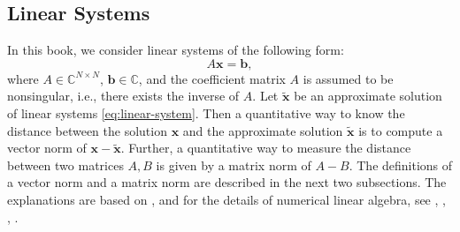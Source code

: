 \subsection{{Linear Systems}}\label{sec:linear-systems}
{In this book, we consider linear systems of the following form:}
\begin{equation}\label{eq:linear-system}
A\bm x=\bm b,
\end{equation}
{where $A\in\mathbb C^{N\times N}$, $\bm b\in\mathbb C$, and the coefficient matrix $A$ is assumed to be nonsingular, i.e., there exists the inverse of $A$.}
{Let $\tilde{\bm x}$ be an approximate solution of linear systems \eqref{eq:linear-system}. Then a quantitative way to know the distance between the solution $\bm x$ and the approximate solution $\tilde{\bm x}$ is to compute a vector norm of $\bm x-\tilde{\bm x}$. Further, a quantitative way to measure the distance between two matrices $A,B$ is given by a matrix norm of $A-B$. The definitions of a vector norm and a matrix norm are described in the next two subsections. The explanations are based on , and for the details of numerical linear algebra, see , , , .}
